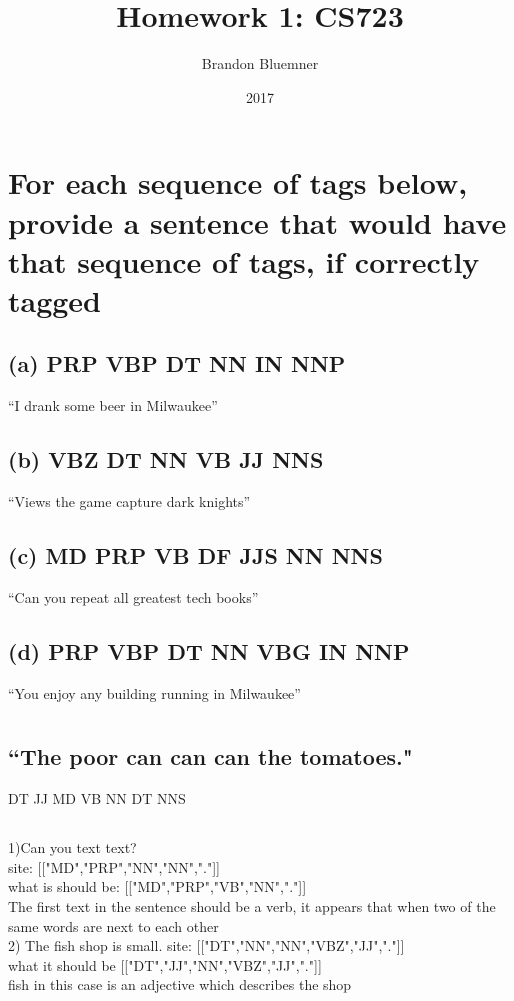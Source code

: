 \documentclass[12pt]{article}
\begin{document}
\title{Homework 1: CS723}
\author{Brandon Bluemner}
\date{2017}
\maketitle
\section{For each sequence of tags below, provide a sentence
 that would have that sequence of tags, if correctly
tagged}
\subsection{(a) PRP VBP DT NN IN NNP}
``I drank some beer in Milwaukee''
\subsection{(b) VBZ DT NN VB JJ NNS}
``Views the game capture dark knights''
\subsection{(c) MD PRP VB DF JJS NN NNS}
``Can you repeat all greatest tech books''
\subsection{(d) PRP VBP DT NN VBG IN NNP}
``You enjoy any building running in Milwaukee''

\section{}
\subsection{``The poor can can can the tomatoes."}
DT JJ MD VB NN DT NNS
\subsection{}

1)Can you text text? \\
site:
[["MD","PRP","NN","NN","."]]
\\
what is should be:
[["MD","PRP","VB","NN","."]]
\\
The first text in the sentence should be a verb, it appears that when two of the same words are next to each other
\\
2) The fish shop is small.
site:
[["DT","NN","NN","VBZ","JJ","."]]
\\
what it should be 
[["DT","JJ","NN","VBZ","JJ","."]]
\\
fish in this case is an adjective which describes the shop
\end{document}
